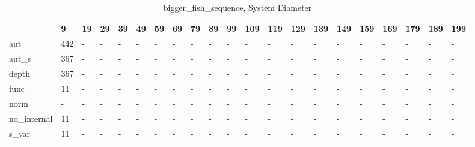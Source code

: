 \begin{table}
\caption{bigger_fish_sequence, System Diameter}
\label{bigger_fish_sequence_diam}
\begin{tabular}{lllllllllllllllllllll}
\toprule
 & 9 & 19 & 29 & 39 & 49 & 59 & 69 & 79 & 89 & 99 & 109 & 119 & 129 & 139 & 149 & 159 & 169 & 179 & 189 & 199 \\
\midrule
aut & 442 & - & - & - & - & - & - & - & - & - & - & - & - & - & - & - & - & - & - & - \\
aut_s & 367 & - & - & - & - & - & - & - & - & - & - & - & - & - & - & - & - & - & - & - \\
depth & 367 & - & - & - & - & - & - & - & - & - & - & - & - & - & - & - & - & - & - & - \\
func & 11 & - & - & - & - & - & - & - & - & - & - & - & - & - & - & - & - & - & - & - \\
norm & - & - & - & - & - & - & - & - & - & - & - & - & - & - & - & - & - & - & - & - \\
no_internal & 11 & - & - & - & - & - & - & - & - & - & - & - & - & - & - & - & - & - & - & - \\
s_var & 11 & - & - & - & - & - & - & - & - & - & - & - & - & - & - & - & - & - & - & - \\
\bottomrule
\end{tabular}
\end{table}
